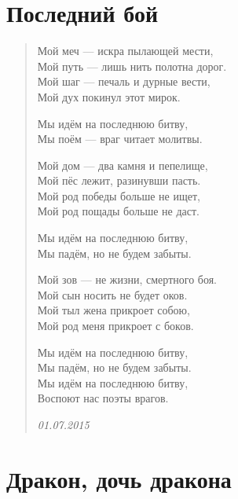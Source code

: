 \documentclass[a4paper,12pt,fleqn]{book}\usepackage{polyglossia}\setdefaultlanguage[babelshorthands=true]{russian}\setotherlanguage{english}\defaultfontfeatures{Ligatures=TeX,Mapping=tex-text}\usepackage{xcolor}\newcommand{\ml}[3]{#2}
\begin{document}
\section{Последний бой}

\begin{verse}
Мой меч --- искра пылающей мести,\\
Мой путь --- лишь нить полотна дорог.\\
Мой шаг --- печаль и дурные вести,\\
Мой дух покинул этот мирок.

Мы идём на последнюю битву,\\
Мы поём --- враг читает молитвы.

Мой дом --- два камня и пепелище,\\
Мой пёс лежит, разинувши пасть.\\
Мой род победы больше не ищет,\\
Мой род пощады больше не даст.

Мы идём на последнюю битву,\\
Мы падём, но не будем забыты.

Мой зов --- не жизни, смертного боя.\\
Мой сын носить не будет оков.\\
Мой тыл жена прикроет собою,\\
Мой род меня прикроет с боков.

Мы идём на последнюю битву,\\
Мы падём, но не будем забыты.\\
Мы идём на последнюю битву,\\
Воспоют нас поэты врагов.

\emph{01.07.2015}
\end{verse} 
\newpage

\section{Дракон, дочь дракона}
\end{document}
